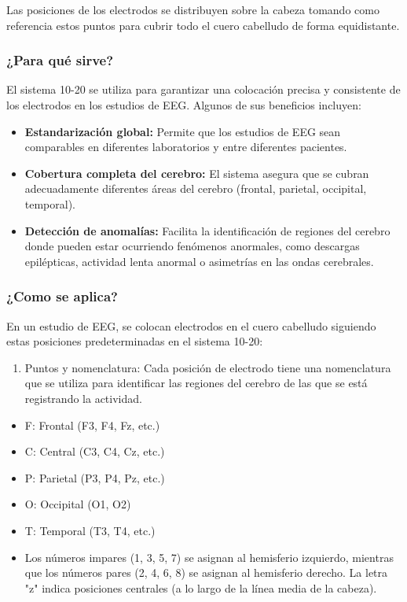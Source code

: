 \documentclass{article}
\begin{document}
Las posiciones de los electrodos se distribuyen sobre la cabeza tomando como referencia estos puntos para cubrir todo el cuero cabelludo de forma equidistante.

\subsubsection{¿Para qué sirve?}
El sistema 10-20 se utiliza para garantizar una colocación precisa y consistente de los electrodos en los estudios de EEG. Algunos de sus beneficios incluyen:

\begin{itemize}

    \item \textbf{Estandarización global:} Permite que los estudios de EEG sean comparables en diferentes laboratorios y entre diferentes pacientes.
    \item \textbf{Cobertura completa del cerebro:} El sistema asegura que se cubran adecuadamente diferentes áreas del cerebro (frontal, parietal, occipital, temporal).
    \item \textbf{Detección de anomalías:} Facilita la identificación de regiones del cerebro donde pueden estar ocurriendo fenómenos anormales, como descargas epilépticas, actividad lenta anormal o asimetrías en las ondas cerebrales.
    
\end{itemize}

\subsubsection{¿Como se aplica?}

En un estudio de EEG, se colocan electrodos en el cuero cabelludo siguiendo estas posiciones predeterminadas en el sistema 10-20:

\begin{enumerate}
    \item Puntos y nomenclatura: Cada posición de electrodo tiene una nomenclatura que se utiliza para identificar las regiones del cerebro de las que se está registrando la actividad.
\end{enumerate}

\begin{itemize}
    \item F: Frontal (F3, F4, Fz, etc.)
    \item C: Central (C3, C4, Cz, etc.)
    \item P: Parietal (P3, P4, Pz, etc.)
    \item O: Occipital (O1, O2)
    \item T: Temporal (T3, T4, etc.)
    \item Los números impares (1, 3, 5, 7) se asignan al hemisferio izquierdo, mientras que los números pares (2, 4, 6, 8) se asignan al hemisferio derecho. La letra "z" indica posiciones centrales (a lo largo de la línea media de la cabeza).
\end{itemize}
\end{document}
